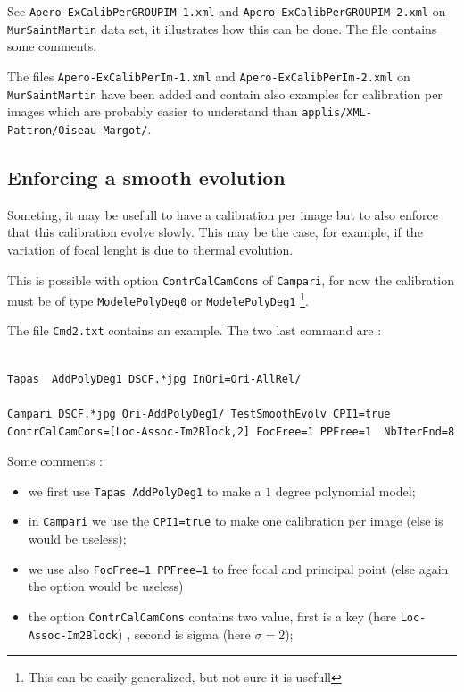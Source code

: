 See {\tt Apero-ExCalibPerGROUPIM-1.xml} and
{\tt Apero-ExCalibPerGROUPIM-2.xml}  on  {\tt MurSaintMartin} data
set, it illustrates how this can be done. The file contains
some comments.


The files {\tt Apero-ExCalibPerIm-1.xml} and {\tt Apero-ExCalibPerIm-2.xml}
on  {\tt MurSaintMartin} have been added and contain also
examples for calibration per images which are probably easier to understand
than {\tt  applis/XML-Pattron/Oiseau-Margot/}.




\subsection{Enforcing a smooth evolution}

Someting, it may be usefull to have a calibration per image but to also
enforce that this calibration evolve slowly. This may be the case,
for example, if the  variation of focal lenght is due to thermal evolution.

This is possible with option {\tt  ContrCalCamCons} of {\tt Campari}, for now
the calibration must be of type {\tt ModelePolyDeg0} or {\tt ModelePolyDeg1}
\footnote{This can be easily generalized, but not sure it is usefull}.

The file {\tt Cmd2.txt} contains an example. The two last command are  :

\begin{verbatim}

Tapas  AddPolyDeg1 DSCF.*jpg InOri=Ori-AllRel/

Campari DSCF.*jpg Ori-AddPolyDeg1/ TestSmoothEvolv CPI1=true ContrCalCamCons=[Loc-Assoc-Im2Block,2] FocFree=1 PPFree=1  NbIterEnd=8
\end{verbatim}

Some comments :

\begin{itemize}
   \item   we first use {\tt Tapas AddPolyDeg1} to make a $1$  degree polynomial model;
   \item   in {\tt Campari} we use the {\tt CPI1=true} to  make one calibration per image (else is would be useless);
   \item    we use also {\tt FocFree=1 PPFree=1} to free focal and principal point (else again the option would be useless)
   \item     the option {\tt ContrCalCamCons} contains two value, first is a key (here {\tt Loc-Assoc-Im2Block})
             , second is sigma (here $\sigma=2$);
\end{itemize}

